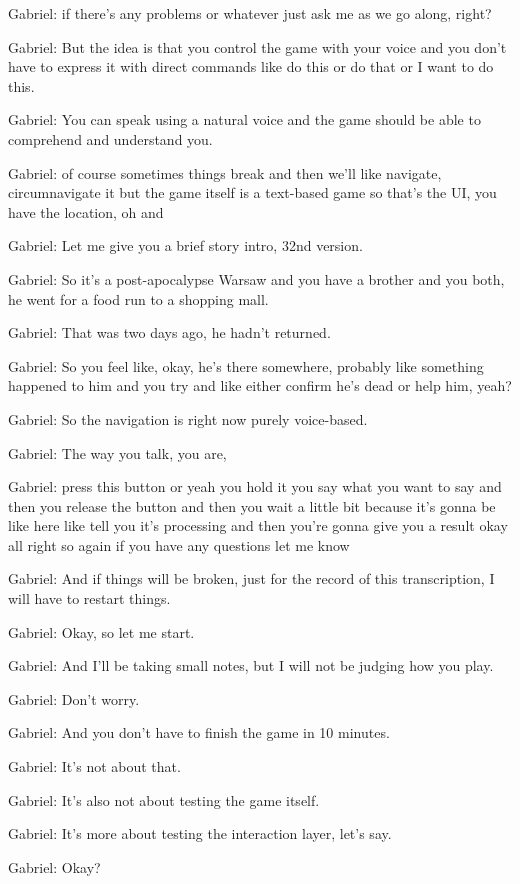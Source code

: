 Gabriel: if there's any problems or whatever just ask me as we go along, right?

Gabriel: But the idea is that you control the game with your voice and you don't have to express it with direct commands like do this or do that or I want to do this.

Gabriel: You can speak using a natural voice and the game should be able to comprehend and understand you.

Gabriel: of course sometimes things break and then we'll like navigate, circumnavigate it but the game itself is a text-based game so that's the UI, you have the location, oh and

Gabriel: Let me give you a brief story intro, 32nd version.

Gabriel: So it's a post-apocalypse Warsaw and you have a brother and you both, he went for a food run to a shopping mall.

Gabriel: That was two days ago, he hadn't returned.

Gabriel: So you feel like, okay, he's there somewhere, probably like something happened to him and you try and like either confirm he's dead or help him, yeah?

Gabriel: So the navigation is right now purely voice-based.

Gabriel: The way you talk, you are,

Gabriel: press this button or yeah you hold it you say what you want to say and then you release the button and then you wait a little bit because it's gonna be like here like tell you it's processing and then you're gonna give you a result okay all right so again if you have any questions let me know

Gabriel: And if things will be broken, just for the record of this transcription, I will have to restart things.

Gabriel: Okay, so let me start.

Gabriel: And I'll be taking small notes, but I will not be judging how you play.

Gabriel: Don't worry.

Gabriel: And you don't have to finish the game in 10 minutes.

Gabriel: It's not about that.

Gabriel: It's also not about testing the game itself.

Gabriel: It's more about testing the interaction layer, let's say.

Gabriel: Okay?

